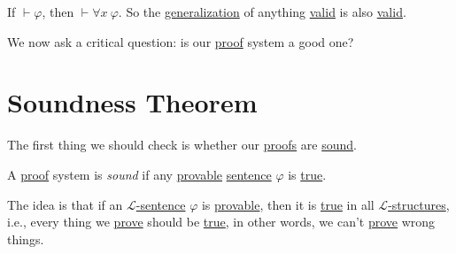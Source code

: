 \begin{corollary}
	If \(\vdash \varphi \), then \(\vdash \forall x\ \varphi \). So the \hyperref[def:generalization]{generalization} of anything \hyperref[def:valid]{valid} is also \hyperref[def:valid]{valid}.
\end{corollary}

We now ask a critical question: is our \hyperref[def:proof]{proof} system a good one?

\section{Soundness Theorem}
The first thing we should check is whether our \hyperref[def:proof]{proofs} are \hyperref[def:sound]{sound}.

\begin{definition}[Sound]\label{def:sound}
	A \hyperref[def:proof]{proof} system is \emph{sound} if any \hyperref[def:proof]{provable} \hyperref[def:sentence]{sentence} \(\varphi \) is \hyperref[def:truth]{true}.
\end{definition}

The idea is that if an \hyperref[def:sentence]{\(\mathcal{L} \)-sentence} \(\varphi \) is \hyperref[def:proof]{provable}, then it is \hyperref[def:truth]{true} in all \hyperref[def:structure]{\(\mathcal{L} \)-structures}, i.e., every thing we \hyperref[def:proof]{prove} should be \hyperref[def:truth]{true}, in other words, we can't \hyperref[def:proof]{prove} wrong things.

